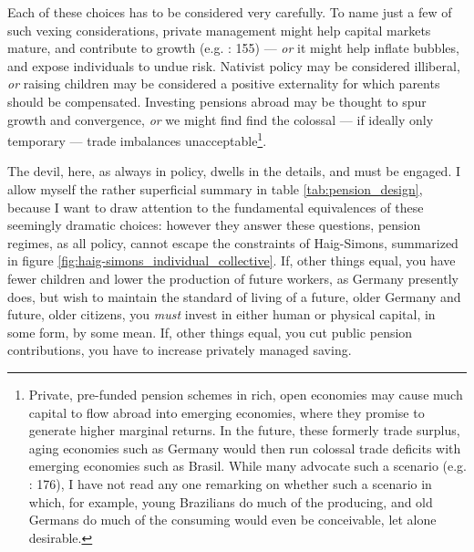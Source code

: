 \documentclass[11pt,a4paper,oneside,openright]{article}
\begin{document}
Each of these choices has to be considered very carefully. To name just a few of such vexing considerations, private management might help capital markets mature, and contribute to growth (e.g. \citealt{Barr2005a}: 155) --- \emph{or} it might help inflate bubbles, and expose individuals to undue risk. Nativist policy may be considered illiberal, \emph{or} raising children may be considered a positive externality for which parents should be compensated. Investing pensions abroad may be thought to spur growth and convergence, \emph{or} we might find find the colossal --- if ideally only temporary --- trade imbalances unacceptable\footnote{
	Private, pre-funded pension schemes in rich, open economies may cause much capital to flow abroad into emerging economies, where they promise to generate higher marginal returns. In the future, these formerly trade surplus, aging economies such as Germany would then run colossal trade deficits with emerging economies such as Brasil. While many advocate such a scenario (e.g. \citealt{Borsch-Supan2003}: 176), I have not read any one remarking on whether such a scenario in which, for example, young Brazilians do much of the producing, and old Germans do much of the consuming would even be conceivable, let alone desirable.}.

The devil, here, as always in policy, dwells in the details, and must be engaged. I allow myself the rather superficial summary in table \ref{tab:pension_design}, because I want to draw attention to the fundamental equivalences of these seemingly dramatic choices: however they answer these questions, pension regimes, as all policy, cannot escape the constraints of Haig-Simons, summarized in figure \ref{fig:haig-simons_individual_collective}. If, other things equal, you have fewer children and lower the production of future workers, as Germany presently does, but wish to maintain the standard of living of a future, older Germany and future, older citizens, you \emph{must} invest in either human or physical capital, in some form, by some mean. If,  other things equal, you cut public pension contributions, you have to increase privately managed saving.
\end{document}
